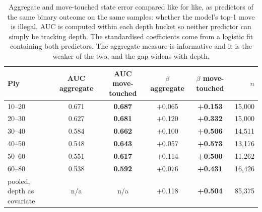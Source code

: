 \begin{table}[t]
\centering\small
\caption{Aggregate and move-touched state error compared like for
like, as predictors of the same binary outcome on the same samples:
whether the model's top-1 move is illegal. AUC is computed within each
depth bucket so neither predictor can simply be tracking depth. The
standardised coefficients come from a logistic fit containing both
predictors. The aggregate measure is informative and it is the weaker of
the two, and the gap widens with depth.}
\label{tab:auc}
\begin{tabular}{lccccr}
\toprule
Ply & AUC aggregate & AUC move-touched & $\beta$ aggregate & $\beta$ move-touched & $n$ \\
\midrule
10--20 & 0.671 & \textbf{0.687} & +0.065 & \textbf{+0.153} & 15{,}000 \\
20--30 & 0.627 & \textbf{0.681} & +0.120 & \textbf{+0.332} & 15{,}000 \\
30--40 & 0.584 & \textbf{0.662} & +0.100 & \textbf{+0.506} & 14{,}511 \\
40--50 & 0.548 & \textbf{0.643} & +0.057 & \textbf{+0.573} & 13{,}176 \\
50--60 & 0.551 & \textbf{0.617} & +0.114 & \textbf{+0.500} & 11{,}262 \\
60--80 & 0.538 & \textbf{0.592} & +0.076 & \textbf{+0.431} & 16{,}426 \\
\midrule
pooled, depth as covariate & n/a & n/a & +0.118 & \textbf{+0.504} & 85{,}375 \\
\bottomrule
\end{tabular}
\end{table}

